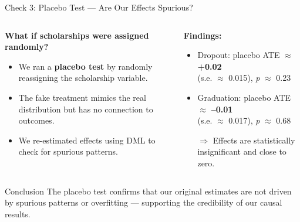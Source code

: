 \documentclass[aspectratio=169]{beamer}
\begin{document}
\begin{frame}{Check 3: Placebo Test — Are Our Effects Spurious?}
\begin{columns}[t]

\begin{column}{0.5\textwidth}
\newline
\textbf{What if scholarships were assigned randomly?}
\begin{itemize}[label=--, itemsep=1pt]
    \item We ran a \textbf{placebo test} by randomly reassigning the scholarship variable.
    \item The fake treatment mimics the real distribution but has no connection to outcomes.
    \item We re-estimated effects using DML to check for spurious patterns.
\end{itemize}

\end{column}

\begin{column}{0.45\textwidth}
\newline
\textbf{Findings:}
\begin{itemize}[label=--, itemsep=1pt]
    \item Dropout: placebo ATE $\approx$ \textbf{+0.02} \\ (s.e. $\approx$ 0.015), \textit{p} $\approx$ 0.23
    \item Graduation: placebo ATE $\approx$ \textbf{–0.01} \\ (s.e. $\approx$ 0.017), \textit{p} $\approx$ 0.68
    \item [$\Rightarrow$] Effects are statistically insignificant and close to zero.
\end{itemize}
\end{column}
\end{columns}
\vspace{10pt}
\begin{block}{Conclusion}
The placebo test confirms that our original estimates are not driven by spurious patterns or overfitting — supporting the credibility of our causal results.
\end{block}
\end{frame}
\end{document}

